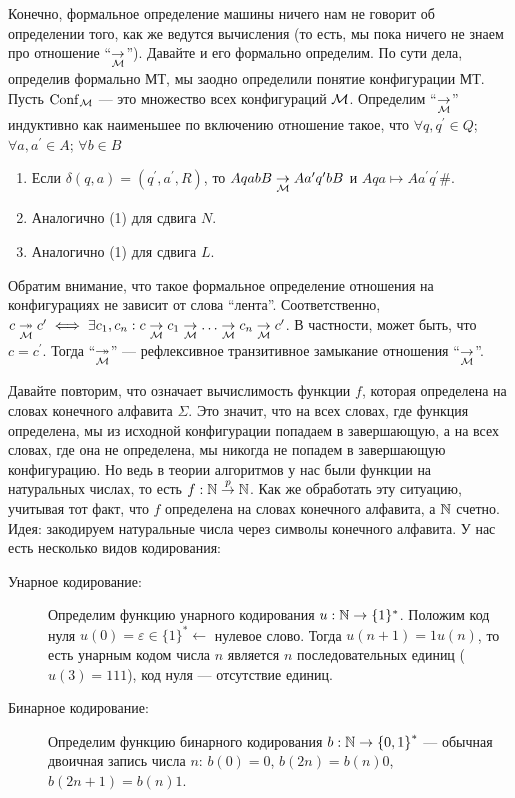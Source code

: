 Конечно, формальное определение машины ничего нам не говорит об определении того, как же ведутся вычисления (то есть, мы пока ничего не знаем про отношение \enquote{$\underset{\mathcal{M}}{\to}$}).
Давайте и его формально определим.
По сути дела, определив формально МТ, мы заодно определили понятие конфигурации МТ.
Пусть $\mathrm{Conf}_{\mathcal{M}}$ --- это множество всех конфигураций $\mathcal{M}$.
Определим \enquote{$\underset{\mathcal{M}}{\to}$} индуктивно как наименьшее по включению отношение такое, что $\forall q, q^{\prime} \in Q$; $\forall a, a^{\prime} \in A$; $\forall b \in B$
\begin{enumerate}
    \item Если $\delta(q, a) = (q^{\prime}, a^{\prime}, R)$, то $AqabB \underset{\mathcal{M}}{\to} A a^{\prime} q^{\prime} b B$ и $A q a \mapsto A a^{\prime} q^{\prime} \#$.
    \item Аналогично (1) для сдвига $N$.
    \item Аналогично (1) для сдвига $L$.
\end{enumerate}
Обратим внимание, что такое формальное определение отношения на конфигурациях не зависит от слова \enquote{лента}.
Соответственно, $c \underset{\mathcal{M}}{\twoheadrightarrow} c^{\prime} \iff \exists c_{1}, c_{n}: c \underset{\mathcal{M}}{\to} c_{1} \underset{\mathcal{M}}{\to} \ldots \underset{\mathcal{M}}{\to} c_{n} \underset{\mathcal{M}}{\to} c^{\prime}$.
В частности, может быть, что $c = c^{\prime}$.
Тогда \enquote{$\underset{\mathcal{M}}{\twoheadrightarrow}$} --- рефлексивное транзитивное замыкание отношения \enquote{$\underset{\mathcal{M}}{\to}$}.

Давайте повторим, что означает вычислимость функции $f$, которая определена на словах конечного алфавита $\Sigma$.
Это значит, что на всех словах, где функция определена, мы из исходной конфигурации попадаем в завершающую, а на всех словах, где она не определена, мы никогда не попадем в завершающую конфигурацию.
Но ведь в теории алгоритмов у нас были функции на натуральных числах, то есть $f: \mathbb{N} \overset{p}{\to} \mathbb{N}$.
Как же обработать эту ситуацию, учитывая тот факт, что $f$ определена на словах конечного алфавита, а $\mathbb{N}$ счетно.
Идея: закодируем натуральные числа через символы конечного алфавита.
У нас есть несколько видов кодирования:
\begin{description}
    \item[Унарное кодирование:] Определим функцию унарного кодирования $u: \mathbb{N} \to \{1\}^{*}$.
    Положим код нуля $u(0) = \varepsilon \in \{1\}^{*} \leftarrow$ нулевое слово.
    Тогда $u(n + 1) = 1u(n)$, то есть унарным кодом числа $n$ является $n$ последовательных единиц ($u(3) = 111$), код нуля --- отсутствие единиц.
    \item[Бинарное кодирование:] Определим функцию бинарного кодирования $b: \mathbb{N} \to \left\{0, 1\right\}^{*}$ --- обычная двоичная запись числа $n$: $b(0) = 0$, $b(2n) = b(n)0$, $b(2n + 1) = b(n)1$.
\end{description}

